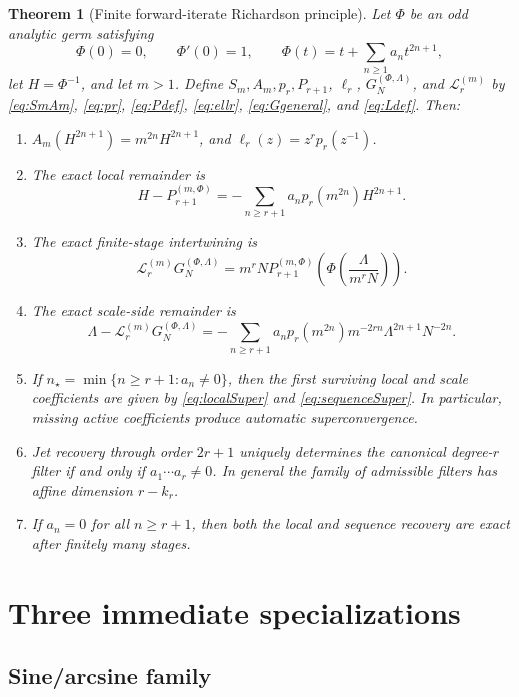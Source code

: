 \documentclass[11pt]{article}
\newtheorem{theorem}{Theorem}[section]
\theoremstyle{remark}
\newcommand{\Lop}{\mathcal L}
\begin{document}
\begin{theorem}[Finite forward-iterate Richardson principle]
\label{thm:master}
Let \(\Phi\) be an odd analytic germ satisfying
\[
\Phi(0)=0,
\qquad
\Phi'(0)=1,
\qquad
\Phi(t)=t+\sum_{n\ge1}a_nt^{2n+1},
\]
let \(H=\Phi^{-1}\), and let \(m>1\).  Define \(S_m,A_m,p_r,P_{r+1}\),
\(\ell_r\), \(G_N^{(\Phi,\Lambda)}\), and \(\Lop_r^{(m)}\) by
\eqref{eq:SmAm}, \eqref{eq:pr}, \eqref{eq:Pdef}, \eqref{eq:ellr},
\eqref{eq:Ggeneral}, and \eqref{eq:Ldef}.  Then:
\begin{enumerate}[label=(\alph*)]
\item \(A_m(H^{2n+1})=m^{2n}H^{2n+1}\), and
      \(\ell_r(z)=z^rp_r(z^{-1})\).
\item The exact local remainder is
\[
H-P_{r+1}^{(m,\Phi)}
=
-\sum_{n\ge r+1}
a_np_r(m^{2n})H^{2n+1}.
\]
\item The exact finite-stage intertwining is
\[
\Lop_r^{(m)}G_N^{(\Phi,\Lambda)}
=
m^rN P_{r+1}^{(m,\Phi)}
\!\left(\Phi\!\left(\frac{\Lambda}{m^rN}\right)\right).
\]
\item The exact scale-side remainder is
\[
\Lambda-\Lop_r^{(m)}G_N^{(\Phi,\Lambda)}
=
-\sum_{n\ge r+1}
a_np_r(m^{2n})m^{-2rn}
\Lambda^{2n+1}N^{-2n}.
\]
\item If \(n_\star=\min\{n\ge r+1:a_n\neq0\}\), then the first surviving
      local and scale coefficients are given by
      \eqref{eq:localSuper} and \eqref{eq:sequenceSuper}.  In particular,
      missing active coefficients produce automatic superconvergence.
\item Jet recovery through order \(2r+1\) uniquely determines the
      canonical degree-\(r\) filter if and only if
      \(a_1\cdots a_r\neq0\).  In general the family of admissible filters
      has affine dimension \(r-k_r\).
\item If \(a_n=0\) for all \(n\ge r+1\), then both the local and sequence
      recovery are exact after finitely many stages.
\end{enumerate}
\end{theorem}

\section{Three immediate specializations}

\subsection{Sine/arcsine family}
\end{document}
